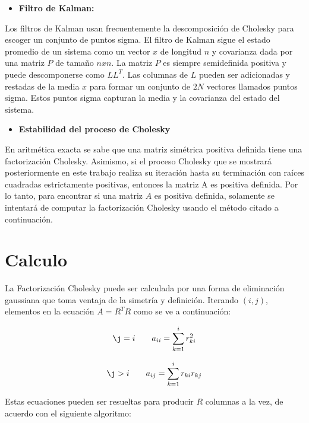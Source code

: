 \documentclass[10pt, oneside,spanish]{article}
\begin{document}
\begin{itemize}
\item \textbf{Filtro de Kalman:}
\end{itemize}

Los filtros de Kalman usan frecuentemente la descomposición de Cholesky para escoger un conjunto de puntos sigma. El filtro de Kalman sigue el estado promedio de un sistema como un vector $x$ de longitud $n$ y covarianza dada por una matriz $P$ de tamaño $nxn$. La matriz $P$ es siempre semidefinida positiva y puede descomponerse como $LL^T$. Las columnas de $L$ pueden ser adicionadas y restadas de la media $x$ para formar un conjunto de $2N$ vectores llamados puntos sigma. Estos puntos sigma capturan la media y la covarianza del estado del sistema.

\begin{itemize}
\item \textbf{Estabilidad del proceso de Cholesky}
\end{itemize}

En aritmética exacta se sabe que una matriz simétrica positiva definida tiene una factorización Cholesky. Asimismo, si el proceso Cholesky que se mostrará posteriormente en este trabajo realiza su iteración hasta su terminación con raíces cuadradas estrictamente positivas, entonces la matriz A es positiva definida.
Por lo tanto, para encontrar si una matriz $A$ es positiva definida, solamente se intentará de computar la factorización Cholesky usando el método citado a continuación.

\section{Calculo}

La Factorización Cholesky puede ser calculada por una forma de eliminación gaussiana que toma ventaja de la simetría y definición. Iterando $(i,j)$, elementos en la ecuación $A = R^TR$ como se ve a continuación:

\begin{equation}
\j = i \qquad a_{ii} = {\displaystyle\sum_{k=1}^{i}{r^2_{ki}}}
\end{equation}

\begin{equation}
\j>i \qquad a_{ij} = {\displaystyle\sum_{k=1}^{i}{r_{ki}}{r_{kj}}}
\end{equation}

Estas ecuaciones pueden ser resueltas para producir $R$ columnas a la vez, de acuerdo con el siguiente algoritmo:
\end{document}
